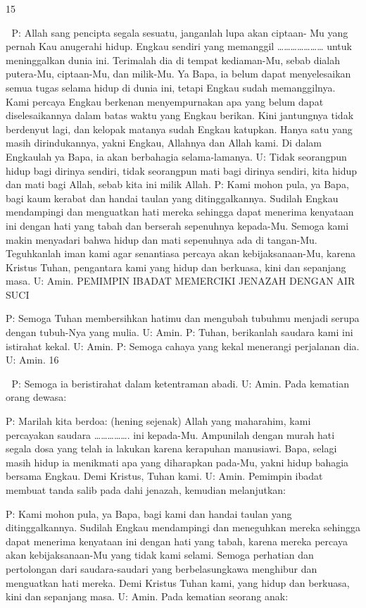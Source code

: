 \documentclass[10pt,a5paper,fancyhdr]{memoir}
\begin{document}
15 



P: Allah sang pencipta segala sesuatu, janganlah lupa akan ciptaan-
Mu yang pernah Kau anugerahi hidup. Engkau sendiri yang 
memanggil ………………… untuk meninggalkan dunia ini. 
Terimalah dia di tempat kediaman-Mu, sebab dialah putera-Mu, 
ciptaan-Mu, dan milik-Mu. Ya Bapa, ia belum dapat menyelesaikan 
semua tugas selama hidup di dunia ini, tetapi Engkau sudah 
memanggilnya. Kami percaya Engkau berkenan menyempurnakan 
apa yang belum dapat diselesaikannya dalam batas waktu yang 
Engkau berikan. Kini jantungnya tidak berdenyut lagi, dan kelopak 
matanya sudah Engkau katupkan. Hanya satu yang masih 
dirindukannya, yakni Engkau, Allahnya dan Allah kami. Di dalam 
Engkaulah ya Bapa, ia akan berbahagia selama-lamanya. 
U: Tidak seorangpun hidup bagi dirinya sendiri, tidak seorangpun 
mati bagi dirinya sendiri, kita hidup dan mati bagi Allah, sebab kita 
ini milik Allah. 
P: Kami mohon pula, ya Bapa, bagi kaum kerabat dan handai taulan 
yang ditinggalkannya. Sudilah Engkau mendampingi dan 
menguatkan hati mereka sehingga dapat menerima kenyataan ini 
dengan hati yang tabah dan berserah sepenuhnya kepada-Mu. 
Semoga kami makin menyadari bahwa hidup dan mati sepenuhnya 
ada di tangan-Mu. Teguhkanlah iman kami agar senantiasa percaya 
akan kebijaksanaan-Mu, karena Kristus Tuhan, pengantara kami yang 
hidup dan berkuasa, kini dan sepanjang masa. 
U: Amin. 
PEMIMPIN IBADAT MEMERCIKI JENAZAH DENGAN AIR 
SUCI 

P: Semoga Tuhan membersihkan hatimu dan mengubah tubuhmu 
menjadi serupa dengan tubuh-Nya yang mulia. 
U: Amin. 
P: Tuhan, berikanlah saudara kami ini istirahat kekal. 
U: Amin. 
P: Semoga cahaya yang kekal menerangi perjalanan dia. 
U: Amin. 
16 



P: Semoga ia beristirahat dalam ketentraman abadi. 
U: Amin. 
Pada kematian orang dewasa: 

P: Marilah kita berdoa: (hening sejenak) Allah yang maharahim, 
kami percayakan saudara ……………. ini kepada-Mu. Ampunilah 
dengan murah hati segala dosa yang telah ia lakukan karena 
kerapuhan manusiawi. Bapa, selagi masih hidup ia menikmati apa 
yang diharapkan pada-Mu, yakni hidup bahagia bersama Engkau. 
Demi Kristus, Tuhan kami. 
U: Amin. 
Pemimpin ibadat membuat tanda salib pada dahi jenazah, kemudian 
melanjutkan: 

P: Kami mohon pula, ya Bapa, bagi kami dan handai taulan yang 
ditinggalkannya. Sudilah Engkau mendampingi dan meneguhkan 
mereka sehingga dapat menerima kenyataan ini dengan hati yang 
tabah, karena mereka percaya akan kebijaksanaan-Mu yang tidak 
kami selami. Semoga perhatian dan pertolongan dari saudara-saudari 
yang berbelasungkawa menghibur dan menguatkan hati mereka. 
Demi Kristus Tuhan kami, yang hidup dan berkuasa, kini dan 
sepanjang masa. 
U: Amin. 
Pada kematian seorang anak: 
\end{document}
